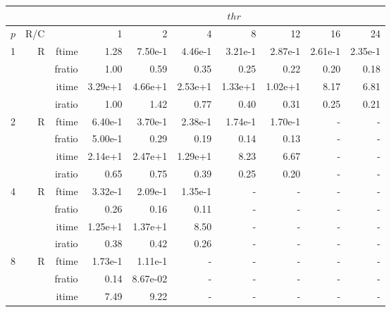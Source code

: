 \documentclass[a4paper]{article}
\begin{document}
\begin{table}[htbp]
\begin{center}
\begin{small}
\begin{tabular}{|r|r|r|r|r|r|r|r|r|r|}
\hline 
     & & & \multicolumn{7}{c|}{$thr$} \\ \hline
    $p$ & R/C &  & 1           & 2    & 4    & 8    & 12   & 16    & 24  \\ \hline\hline
   1 &  R &   ftime &    1.28  &    7.50e-1 &    4.46e-1 &    3.21e-1 &    2.87e-1 &    2.61e-1 &    2.35e-1 \\
             &             &  fratio &    1.00 &   0.59 &    0.35 &    0.25 &    0.22 &    0.20 &    0.18 \\
             &             &  itime &    3.29e+1 &   4.66e+1 &   2.53e+1 &   1.33e+1 &   1.02e+1 &   8.17  &    6.81  \\
             &             &  iratio &    1.00 &    1.42  &    0.77 &    0.40 &    0.31 &    0.25 &   0.21 \\\hline
   2 &  R &   ftime &    6.40e-1 &    3.70e-1 &    2.38e-1 &    1.74e-1 &    1.70e-1 &      - &      - \\
             &             &  fratio &    5.00e-1 &   0.29 &   0.19 &    0.14 &    0.13 &      - &      - \\
             &             &  itime &    2.14e+1 &   2.47e+1 &   1.29e+1 &   8.23  &    6.67  &      - &      - \\
             &             &  iratio &    0.65 &    0.75 &    0.39 &    0.25 &    0.20 &      - &      - \\\hline
   4 &  R &   ftime &    3.32e-1 &    2.09e-1 &    1.35e-1 &      - &      - &      - &      - \\
             &             &  fratio &    0.26 &    0.16 &   0.11 &      - &      - &      - &      - \\
             &             &  itime &    1.25e+1 &   1.37e+1 &   8.50  &      - &      - &      - &      - \\
             &             &  iratio &    0.38 &   0.42 &    0.26 &      - &      - &      - &      - \\\hline
   8 &   R &   ftime &    1.73e-1 &    1.11e-1 &      - &      - &      - &      - &      - \\
             &             &  fratio &    0.14 &    8.67e-02 &     - &      - &      - &      - &      - \\
             &             &  itime &    7.49  &    9.22  &      - &      - &      - &      - &      - \\

\end{tabular}
\end{small}
\end{center}
\end{table}
\end{document}
